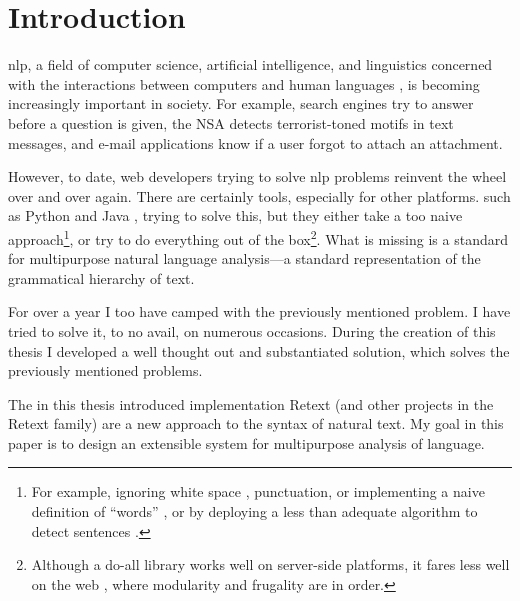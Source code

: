 
\begingroup
\let\clearpage\relax
\let\cleardoublepage\relax
\let\cleardoublepage\relax

\chapter*{Introduction}

\Gls{nlp}, a field of computer science, artificial intelligence, and
linguistics concerned with the interactions between computers and human
languages \autocite[according to WikiPedia, see
][]{wikipedia-natural-language-processing}, is becoming increasingly
important in society. For example, search engines try to answer before a
question is given, the NSA detects terrorist-toned motifs in text
messages, and e-mail applications know if a user forgot to attach an
attachment.

However, to date, web developers trying to solve \gls{nlp} problems
reinvent the wheel over and over again. There are certainly tools,
especially for other platforms. such as Python
\autocite{nltk-source} and Java \autocite{opennlp-source},
trying to solve this, but they either take a too naive
approach\footnote{For example, ignoring white space
  \autocite[See][]{loadfive/knwl-source-code}, punctuation, or
  implementing a naive definition of ``words'' \autocite[such
  as][]{nhunzaker/speakeasy-source-code}, or by deploying a less than
  adequate algorithm to detect sentences \autocite[such
  as][]{nytimes/emphasis-source-code}.}, or try to do everything out of
the box\footnote{Although a do-all library works well on server-side
  platforms, it fares less well on the web \autocite[such
  as][]{NaturalNode/natural-source-code}, where modularity and frugality
  are in order.}. What is missing is a standard for multipurpose natural
language analysis---a standard representation of the grammatical
hierarchy of text.

For over a year I too have camped with the previously mentioned problem.
I have tried to solve it, to no avail, on numerous occasions. During the
creation of this thesis I developed a well thought out and substantiated
solution, which solves the previously mentioned problems.

The in this thesis introduced implementation Retext (and other projects
in the Retext family) are a new approach to the syntax of natural text.
My goal in this paper is to design an extensible system for multipurpose
analysis of language.

